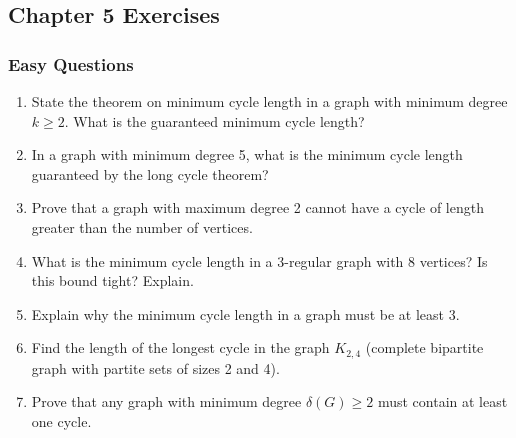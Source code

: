 \documentclass{article}
\theoremstyle{definition}
\begin{document}
\pagebreak
\newpage

\subsection{Chapter 5 Exercises}

\subsubsection{Easy Questions}
\begin{enumerate}
\item State the theorem on minimum cycle length in a graph with minimum degree $k \geq 2$. What is the guaranteed minimum cycle length?

\item In a graph with minimum degree 5, what is the minimum cycle length guaranteed by the long cycle theorem?

\item Prove that a graph with maximum degree 2 cannot have a cycle of length greater than the number of vertices.

\item What is the minimum cycle length in a 3-regular graph with 8 vertices? Is this bound tight? Explain.

\item Explain why the minimum cycle length in a graph must be at least 3.

\item Find the length of the longest cycle in the graph $K_{2,4}$ (complete bipartite graph with partite sets of sizes 2 and 4).

\item Prove that any graph with minimum degree $\delta(G) \geq 2$ must contain at least one cycle.
\end{enumerate}
\end{document}
